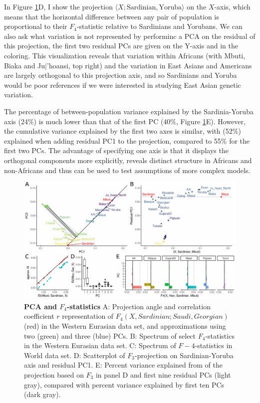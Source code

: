 \documentclass[12pt,fullpage, a4paper]{article}
\begin{document}
In Figure \ref{fig:f4}D, I show the projection $\langle X; \text{Sardinian}, \text{Yoruba} \rangle$ on the $X$-axis, which means that the horizontal difference between any pair of population is proportional to their $F_4$-statistic relative to Sardinians and Yorubans. We can also ask what variation is not represented by performinc a PCA on the residual of this projection, the first two residual PCs are given on the Y-axis and in the coloring. This visualization reveals that variation within Africans (with Mbuti, Biaka and Ju$\vert$'hoansi, top right) and the variation in East Asians and Americans are largely orthogonal to this projection axis, and so Sardinians and Yoruba would be poor references if we were interested in studying East Asian genetic variation.

The percentage of between-population variance explained by the Sardinia-Yoruba axis (24\%) is much lower than that of the first PC (40\%, Figure \ref{fig:f4}E). However, the cumulative variance explained by the first two axes is similar, with (52\%) explained when adding residual PC1 to the projection, compared to 55\% for the first two PCs. The advantage of specifying one axis is that it displays the orthogonal components more explicitly, reveals distinct structure in Africans and non-Africans and thus can be used to test assumptions of more complex models.

\begin{figure}[!ht]
\includegraphics[width=\textwidth]{figures/fig_data_world.pdf}	
	\caption{\textbf{PCA and $F_4$-statistics} A: Projection angle and correlation coefficient $r$ representation of $F_4(X, Sardinian; Saudi, Georgian)$ (red) in the Western Eurasian data set, and approximations using two (green) and three (blue) PCs.
	B: Spectrum of select $F_4$-statistics in the Western Eurasian data set.  C: Spectrum of $F-4$-statistics in World data set. D: Scatterplot of $F_3$-projection on Sardinian-Yoruba axis  and residual PC1.
	E: Percent variance explained from of the projection based on $F_3$ in panel D and first nine residual PCs (light gray), compared with percent variance explained by first ten PCs (dark gray).
	}
\label{fig:f4}
\end{figure}
\end{document}
